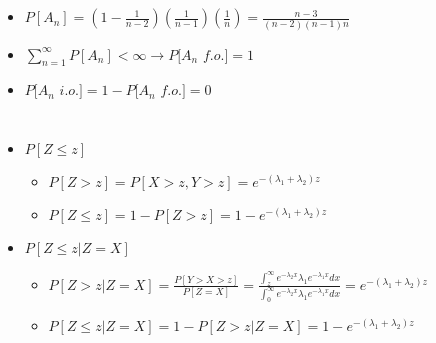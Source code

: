 \documentclass[a4paper]{article}
\begin{document}
\section{}
\begin{itemize}
\begin{figure} [H]
    \texttt{[image: question/4.png]}
\end{figure}
    \item $P[A_n] = (1-\frac{1}{n-2})(\frac{1}{n-1})(\frac{1}{n}) = \frac{n-3}{(n-2)(n-1)n}$
    \item $\sum_{n = 1}^\infty P[A_n] < \infty \rightarrow P[A_n$ $f.o.] = 1$
    \item $P[A_n$ $i.o.] = 1 - P[A_n$ $f.o.] = 0$
\end{itemize}

\section{}
\begin{itemize}
\begin{figure} [H]
    \texttt{[image: question/5.png]}
\end{figure}
    \item $P[Z \leq z]$
        \begin{itemize}
            \item $P[Z > z] = P[X > z, Y>z] = e^{-(\lambda_1 + \lambda_2)z}$
            \item $P[Z \leq z] = 1 - P[Z>z] = 1 - e^{-(\lambda_1 + \lambda_2)z}$
        \end{itemize}
    \item $P[Z \leq z | Z=X]$
        \begin{itemize}
            \item $P[Z > z | Z=X] = \frac{P[Y>X>z]}{P[Z=X]} = \frac{\int_z^\infty e^{-\lambda_2x} \lambda_1 e^{-\lambda_1x}dx}{\int_0^\infty e^{-\lambda_2x} \lambda_1 e^{-\lambda_1x}dx} = e^{-(\lambda_1 + \lambda_2)z}$
            \item $P[Z \leq z | Z=X] = 1 - P[Z>z | Z=X] = 1 - e^{-(\lambda_1 + \lambda_2)z}$
        \end{itemize}
\end{itemize}
\end{document}
